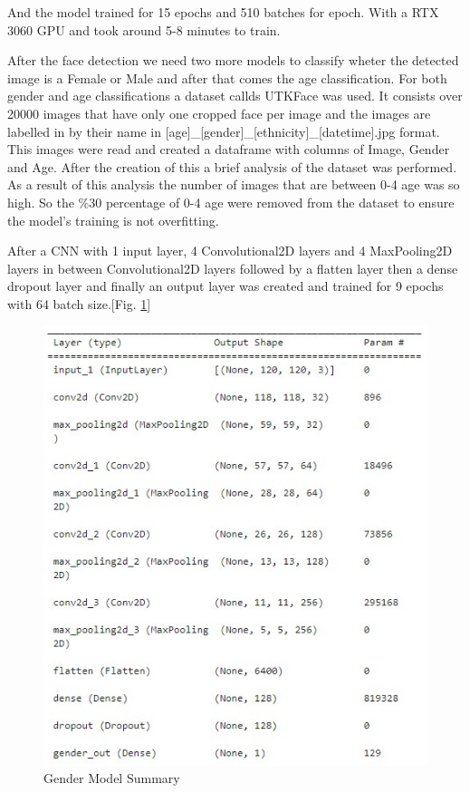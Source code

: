 \documentclass[conference]{IEEEtran}
\begin{document}
\bigskip

And the model trained for 15 epochs and 510 batches for epoch. With a RTX 3060 GPU and took around 5-8 minutes to train.

\bigskip

After the face detection we need two more models to classify wheter the detected image is a Female or Male and after that comes the age classification. For both gender and age classifications a dataset callds UTKFace was used. It consists over 20000 images that have only one cropped face per image and the images are labelled in by their name in [age]\_[gender]\_[ethnicity]\_[datetime].jpg format. 
This images were read and created a dataframe with columns of Image, Gender and Age.
After the creation of this a brief analysis of the dataset was performed. As a result of this analysis the number of images that are between 0-4 age was so high. So the \%30 percentage of 0-4 age were removed from the dataset to ensure the model's training is not overfitting. 

\bigskip

After a CNN with 1 input layer, 4 Convolutional2D layers and 4 MaxPooling2D layers in between Convolutional2D layers followed by a flatten layer then a dense dropout layer and finally an output layer was created and trained for 9 epochs with 64 batch size.[Fig. \ref{fig:Gendermodelsummary}]

\begin{figure}[htbp]
\centering
\includegraphics[scale=0.60]{gendermodelsummary.jpg}
\caption{Gender Model Summary}
\label{fig:Gendermodelsummary}
\end{figure}
\end{document}
